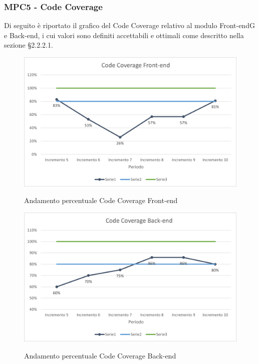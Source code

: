 \subsubsection{MPC5 - Code Coverage}
Di seguito è riportato il grafico del Code Coverage relativo al modulo Front-end{G} e Back-end, i cui valori sono definiti accettabili e ottimali come descritto nella sezione §2.2.2.1.\\

\begin{figure}[H]
\centering
\includegraphics[scale=0.78]{res/ResocontoAttivitaDiVerifica/res/metriche/grafici/img/CCFE.png}\\
\caption{Andamento percentuale Code Coverage Front-end}
\end{figure}

\begin{figure}[H]
\centering
\includegraphics[scale=0.78]{res/ResocontoAttivitaDiVerifica/res/metriche/grafici/img/CCBE.png}\\
\caption{Andamento percentuale Code Coverage Back-end}
\end{figure}

